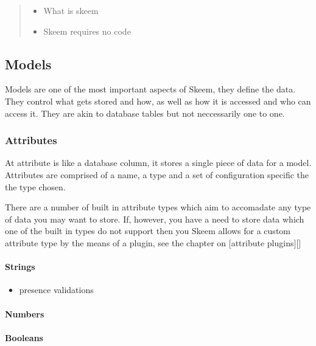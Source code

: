 \documentclass[
  12pt,
]{article}
\providecommand{\tightlist}{%
  \setlength{\itemsep}{0pt}\setlength{\parskip}{0pt}}
\let\oldparagraph\paragraph
\renewcommand{\paragraph}[1]{\oldparagraph{#1}\mbox{}}
\begin{document}
\begin{quote}
\begin{itemize}
\tightlist
\item
  What is skeem
\item
  Skeem requires no code
\end{itemize}
\end{quote}

\hypertarget{models}{%
\subsection{Models}\label{models}}

Models are one of the most important aspects of Skeem, they define the
data. They control what gets stored and how, as well as how it is
accessed and who can access it. They are akin to database tables but not
neccessarily one to one.

\hypertarget{attributes}{%
\subsubsection{Attributes}\label{attributes}}

At attribute is like a database column, it stores a single piece of data
for a model. Attributes are comprised of a name, a type and a set of
configuration specific the the type chosen.

There are a number of built in attribute types which aim to accomadate
any type of data you may want to store. If, however, you have a need to
store data which one of the built in types do not support then you Skeem
allows for a custom attribute type by the means of a plugin, see the
chapter on {[}attribute plugins{]}{[}{]}

\hypertarget{strings}{%
\paragraph{Strings}\label{strings}}

\begin{itemize}
\tightlist
\item
  presence validations
\end{itemize}

\hypertarget{numbers}{%
\paragraph{Numbers}\label{numbers}}

\hypertarget{booleans}{%
\paragraph{Booleans}\label{booleans}}
\end{document}
